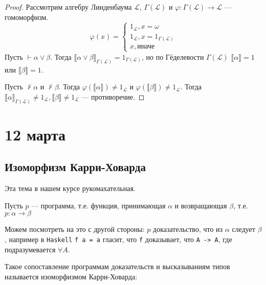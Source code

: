 \begin{proof}
    Рассмотрим алгебру Линденбаума \(\mathcal{L}\), \(\Gamma(\mathcal{L})\) и \(\varphi : \Gamma(\mathcal{L}) \to \mathcal{L}\) --- гомоморфизм.
    \[\varphi(x) = \begin{cases}
            1_\mathcal{L}, x = \omega                  \\
            1_\mathcal{L}, x = 1_{\Gamma(\mathcal{L})} \\
            x, \text{иначе}
        \end{cases}\]
    Пусть \(\vdash \alpha \lor \beta\). Тогда \(\llbracket \alpha \lor \beta \rrbracket_{\Gamma(\mathcal{L})} = 1_{\Gamma(\mathcal{L})}\), но по Гёделевости \(\Gamma(\mathcal{L})\) \(\llbracket \alpha \rrbracket = 1\) или \(\llbracket \beta \rrbracket = 1\).

    Пусть \(\nvdash \alpha\) и \(\nvdash \beta\). Тогда \(\varphi(\llbracket \alpha \rrbracket) \neq 1_{\mathcal{L}}\) и \(\varphi(\llbracket \beta \rrbracket) \neq 1_{\mathcal{L}}\). Тогда \(\llbracket \alpha \rrbracket_{\Gamma(\mathcal{L})} \neq 1_\mathcal{L}, \llbracket \beta \rrbracket \neq 1_\mathcal{L}\) --- противоречие.
\end{proof}

\chapter{12 марта}

\section{Изоморфизм Карри-Ховарда}

\begin{remark}
    Эта тема в нашем курсе рукомахательная.
\end{remark}

Пусть \(p\) --- программа, т.е. функция, принимающая \(\alpha\) и возвращающая \(\beta\), т.е. \(p : \alpha \to \beta\)

Можем посмотреть на это с другой стороны: \(p\) доказательство, что из \(\alpha\) следует \(\beta\), например в \texttt{Haskell} \texttt{f a = a} гласит, что \texttt{f} доказывает, что \texttt{A -> A}, где подразумевается \(\forall A\).

Такое сопоставление программам доказательств и высказываниям типов называется изоморфизмом Карри-Ховарда:

